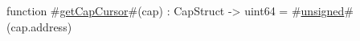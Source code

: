 function #\hyperref[zgetCapCursor]{getCapCursor}#(cap) : CapStruct -> uint64 = #\hyperref[zunsigned]{unsigned}#(cap.address)
